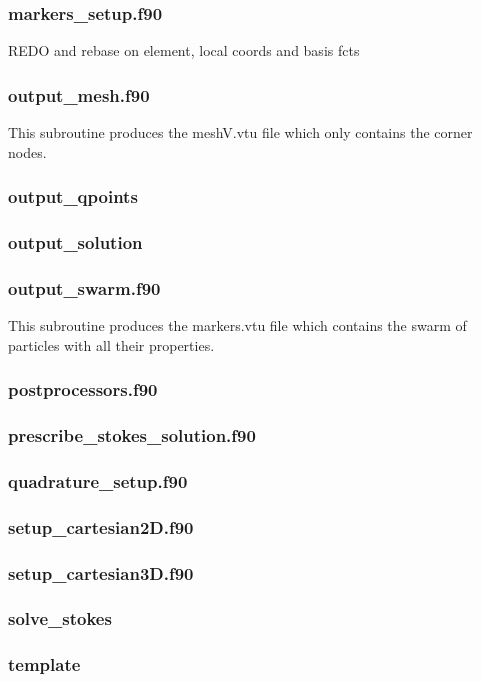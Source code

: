  \subsubsection{markers\_setup.f90}
 REDO and rebase on element, local coords and basis fcts
 \subsubsection{output\_mesh.f90}
 This subroutine produces the {\filenamefont meshV.vtu} file which only 
 contains the corner nodes.
 \subsubsection{output\_qpoints}

 \subsubsection{output\_solution}

 \subsubsection{output\_swarm.f90}
 This subroutine produces the {\filenamefont markers.vtu} file which contains the 
 swarm of particles with all their properties.
 \subsubsection{postprocessors.f90}

 \subsubsection{prescribe\_stokes\_solution.f90}

 \subsubsection{quadrature\_setup.f90}

 \subsubsection{setup\_cartesian2D.f90}
 
 \subsubsection{setup\_cartesian3D.f90}
 
 \subsubsection{solve\_stokes}

 \subsubsection{template}

